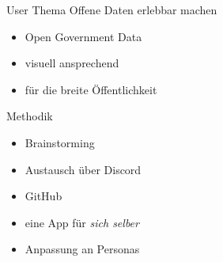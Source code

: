  \begin{frame}{User Thema}
    \alert{Offene Daten erlebbar machen}

    \vspace{0.7cm}
    \begin{itemize}
      \item Open Government Data
      \item visuell ansprechend
      \item für die breite Öffentlichkeit
    \end{itemize}
  \end{frame}
  \begin{frame}{Methodik}
    \begin{itemize}
      \item Brainstorming
      \item Austausch über Discord
      \item GitHub
      \item eine App für \emph{sich selber}
      \item Anpassung an Personas
    \end{itemize}
  \end{frame}